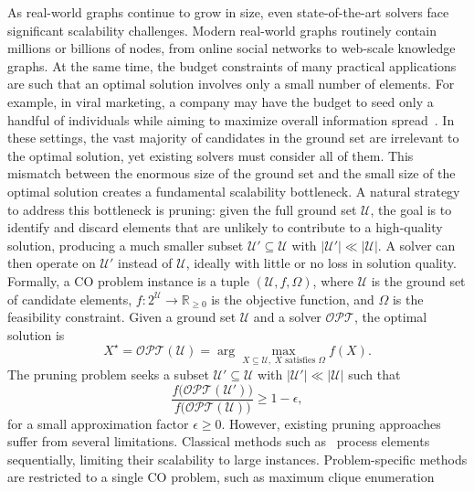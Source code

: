 As real-world graphs continue to grow in size, even state-of-the-art solvers face
significant scalability challenges. Modern real-world graphs routinely contain
millions or billions of nodes, from online social networks to web-scale knowledge
graphs. At the same time, the budget constraints of many practical applications are such
that an optimal solution involves only a small number of elements. For example, in viral
marketing, a company may have the budget to seed only a handful of individuals while
aiming to maximize overall information spread~\citep{kempe2003maximizing}. In these settings,
the vast majority of candidates in the ground set are irrelevant to the optimal
solution, yet existing solvers must consider all of them. This mismatch between the
enormous size of the ground set and the small size of the optimal solution creates a
fundamental scalability bottleneck. A natural strategy to address this bottleneck is pruning: given the full ground set $\mathcal{U}$, the goal is to identify and discard elements that are unlikely to contribute to a high-quality solution, producing a much smaller subset $\mathcal{U}' \subseteq \mathcal{U}$ with $|\mathcal{U}'| \ll |\mathcal{U}|$. A solver can then operate on $\mathcal{U}'$ instead of $\mathcal{U}$, ideally with little or no loss in solution quality. Formally, a CO problem instance is a tuple
$(\mathcal{U}, f, \Omega)$, where $\mathcal{U}$ is the ground set of candidate
elements, $f: 2^{\mathcal{U}} \to \mathbb{R}_{\geq 0}$ is the objective function,
and $\Omega$ is the feasibility constraint. Given a ground set $\mathcal{U}$ and a
solver $\mathcal{OPT}$, the optimal solution is
%
\begin{equation}
  X^\star = \mathcal{OPT}(\mathcal{U}) = \arg\max_{X \subseteq \mathcal{U}, \; X \text{ satisfies } \Omega} f(X).
\end{equation}
%
The pruning problem seeks a subset $\mathcal{U}' \subseteq \mathcal{U}$ with
$|\mathcal{U}'| \ll |\mathcal{U}|$ such that
%
\begin{equation}
  \frac{f\bigl(\mathcal{OPT}(\mathcal{U}')\bigr)}{f\bigl(\mathcal{OPT}(\mathcal{U})\bigr)} \geq 1 - \epsilon,
\end{equation}
%
for a small approximation factor $\epsilon \geq 0$. However, existing pruning approaches suffer from several limitations. Classical methods
such as~\citet{zhou2017scaling} process elements sequentially, limiting their scalability
to large instances. Problem-specific methods are restricted to a single CO problem, such
as maximum clique enumeration~\citep{lauri2019fine, grassia2019learning, lauri2023learning}
